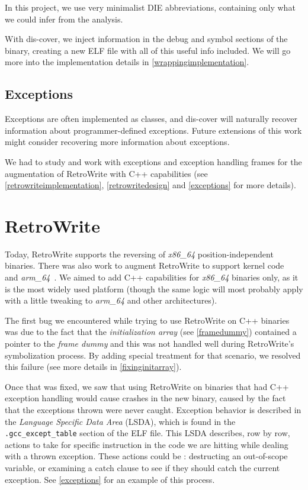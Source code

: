 \documentclass[a4paper,11pt,oneside]{report}
\begin{document}
In this project, we use very minimalist DIE abbreviations, containing only
what we could infer from the analysis.

With dis-cover, we inject information in the debug and symbol sections of the
binary, creating a new ELF file with all of this useful info included.
We will go more into the implementation details in 
\autoref{wrappingimplementation}.

\subsection{Exceptions}

Exceptions are often implemented as classes, and dis-cover will naturally 
recover information about programmer-defined exceptions.
Future extensions of this work might consider recovering more information about 
exceptions.

We had to study and work with exceptions and exception handling frames for 
the augmentation of RetroWrite with C++ capabilities
(see \autoref{retrowriteimplementation}, \autoref{retrowritedesign} and
\autoref{exceptions} for more details).


\section{RetroWrite}
\label{retrowritedesign}

Today, RetroWrite supports the reversing of \emph{x86\_64}
position-independent binaries.
There was also work to augment RetroWrite to support kernel 
code~\cite{rwkernel} and \emph{arm\_64}~\cite{rwarm}.
We aimed to add C++ capabilities for \emph{x86\_64} binaries only, as it is
the most widely used platform (though the same logic will most probably apply
with a little tweaking to \emph{arm\_64} and other architectures).

The first bug we encountered while trying to use RetroWrite on C++ binaries
was due to the fact that the \emph{initialization array} (see
\autoref{framedummy}) contained a pointer to the \emph{frame dummy} and this
was not handled well during RetroWrite's symbolization process.
By adding special treatment for that scenario, we resolved this failure (see
more details in \autoref{fixinginitarray}).

Once that was fixed, we saw that using RetroWrite on binaries that had C++
exception handling would cause crashes in the new binary, caused by the fact
that the exceptions thrown were never caught.
Exception behavior is described in the \emph{Language Specific Data Area}
(LSDA), which is found in the \texttt{.gcc\_except\_table} section of the ELF
file.
This LSDA describes, row by row, actions to take for specific instruction in
the code we are hitting while dealing with a thrown exception. These actions
could be : destructing an out-of-scope variable, or examining a catch clause
to see if they should catch the current exception. See \autoref{exceptions}
for an example of this process.
\end{document}
